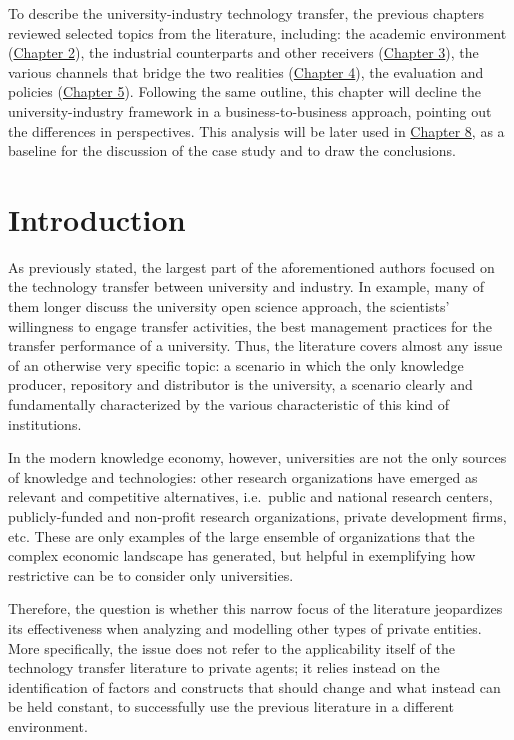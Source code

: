 

\label{Chapter6}

To describe the university-industry technology transfer, the previous chapters reviewed selected topics from the literature, including: the academic environment (\hyperref[Chapter2]{Chapter 2}), the industrial counterparts and other receivers (\hyperref[Chapter3]{Chapter 3}), the various channels that bridge the two realities (\hyperref[Chapter4]{Chapter 4}), the evaluation and policies (\hyperref[Chapter5]{Chapter 5}). Following the same outline, this chapter will decline the university-industry framework in a business-to-business approach, pointing out the differences in perspectives. This analysis will be later used in \hyperref[Chapter8]{Chapter 8}, as a baseline for the discussion of the case study and to draw the conclusions. 

\section{Introduction}

As previously stated, the largest part of the aforementioned authors focused on the technology transfer between university and industry. In example, many of them longer discuss the university open science approach, the scientists' willingness to engage transfer activities, the best management practices for the transfer performance of a university. Thus, the literature covers almost any issue of an otherwise very specific topic: a scenario in which the only knowledge producer, repository and distributor is the university, a scenario clearly and fundamentally characterized by the various characteristic of this kind of institutions.

In the modern knowledge economy, however, universities are not the only sources of knowledge and technologies: other research organizations have emerged as relevant and competitive alternatives, i.e.\ public and national research centers, publicly-funded and non-profit research organizations, private development firms, etc. These are only examples of the large ensemble of organizations that the complex economic landscape has generated, but helpful in exemplifying how restrictive can be to consider only universities.

Therefore, the question is whether this narrow focus of the literature jeopardizes its effectiveness when analyzing and modelling other types of private entities. More specifically, the issue does not refer to the applicability itself of the technology transfer literature to private agents; it relies instead on the identification of factors and constructs that should change and what instead can be held constant, to successfully use the previous literature in a different environment.

